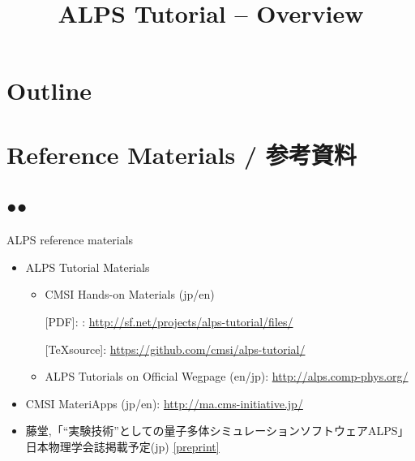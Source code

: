 
\title{ALPS Tutorial -- Overview}




\begin{frame}
  \titlepage
\end{frame}

\section*{Outline}
\begin{frame}[t,fragile]
  \tableofcontents
\end{frame}

\section{Reference Materials / 参考資料}
\subsection*{{\protect\color{red}●}{\protect\color{blue}●}}

\begin{frame}[t,fragile]{ALPS reference materials}
  \begin{itemize}
    \setlength{\itemsep}{1em}
  \item ALPS Tutorial Materials
    \begin{itemize}
    \item CMSI Hands-on Materials (jp/en)
      
      [PDF]: : {\footnotesize \url{http://sf.net/projects/alps-tutorial/files/}}
      
      [\TeX source]: {\footnotesize \url{https://github.com/cmsi/alps-tutorial/}}
      
    \item ALPS Tutorials on Official Wegpage (en/jp): {\footnotesize \url{http://alps.comp-phys.org/}}
    \end{itemize}
  \item CMSI MateriApps (jp/en): {\footnotesize \url{http://ma.cms-initiative.jp/}}
  \item 藤堂,「``実験技術''としての量子多体シミュレーションソフトウェアALPS」日本物理学会誌掲載予定(jp) \href{http://exa.phys.s.u-tokyo.ac.jp/archive/alps-jps-2015.pdf}{\footnotesize [preprint]}
  \end{itemize}
\end{frame}

